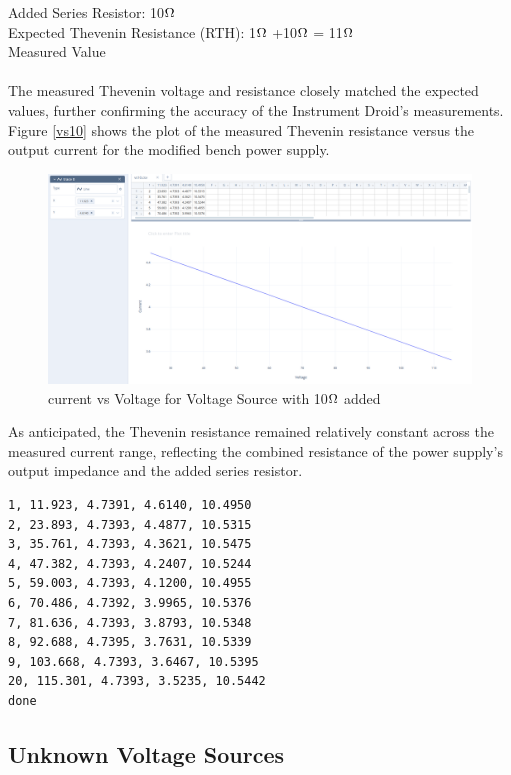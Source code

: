 \documentclass[a4paper,11pt]{article}%
\begin{document}
Added Series Resistor: 10$\ohm$ \\
Expected Thevenin Resistance (RTH): 1$\ohm$ +10$\ohm$  = 11$\ohm$ \\

Measured Value	\\
 \\
The measured Thevenin voltage and resistance closely matched the expected values, further confirming the accuracy of the Instrument Droid's measurements.\\

Figure \ref{vs10} shows the plot of the measured Thevenin resistance versus the output current for the modified bench power supply.\\


\begin{figure}[H]
	\centering
	\includegraphics[scale=0.30]{figures/vs10.png}
  \caption{current vs Voltage for Voltage Source with 10$\ohm$ added}
  \label{fig:vs10}
\end{figure}

As anticipated, the Thevenin resistance remained relatively constant across the measured current range, reflecting the combined resistance of the power supply's output impedance and the added series resistor.

\begin{lstlisting}
1, 11.923, 4.7391, 4.6140, 10.4950
2, 23.893, 4.7393, 4.4877, 10.5315
3, 35.761, 4.7393, 4.3621, 10.5475
4, 47.382, 4.7393, 4.2407, 10.5244
5, 59.003, 4.7393, 4.1200, 10.4955
6, 70.486, 4.7392, 3.9965, 10.5376
7, 81.636, 4.7393, 3.8793, 10.5348
8, 92.688, 4.7395, 3.7631, 10.5339
9, 103.668, 4.7393, 3.6467, 10.5395
20, 115.301, 4.7393, 3.5235, 10.5442
done
\end{lstlisting}

\subsection{Unknown Voltage Sources} 
\end{document}
